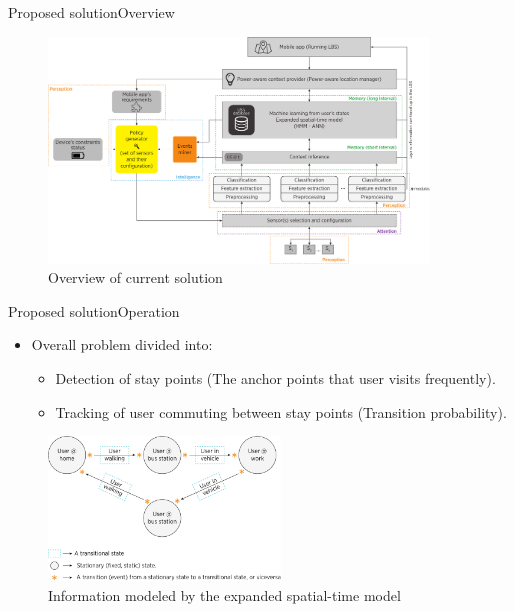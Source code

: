 \documentclass[10pt,xcolor={dvipsnames}]{beamer}
\begin{document}
\begin{frame}{Proposed solution}{Overview}
\begin{figure}
  \centering
  \includegraphics[width=0.9\textwidth]{vectors/solution-general-overview}
  \caption{Overview of current solution}
  \label{fig:solution}
\end{figure}
\end{frame}

\begin{frame}{Proposed solution}{Operation}
\begin{itemize}
  \item Overall problem divided into:
  \begin{itemize}
    \item Detection of stay points (The anchor points that user visits frequently).
    \pause
    \item Tracking of user commuting between stay points (Transition probability).
  \end{itemize}
\end{itemize}
\pause
\begin{figure}
  \centering
  \includegraphics[width=0.55\textwidth]{vectors/zoom-expanded-spatial-time-model}
  \caption{Information modeled by the expanded spatial-time model}
  \label{fig:information-modeled-spatial-time-model}
\end{figure}
\end{frame}
\end{document}
